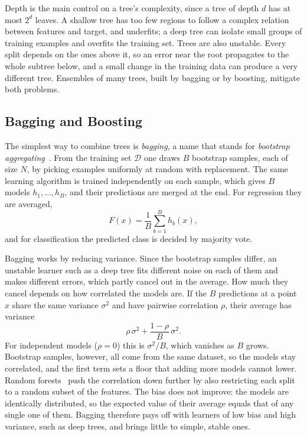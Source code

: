     Depth is the main control on a tree's complexity, since a tree of depth $d$ has
    at most $2^d$ leaves. A shallow tree has too few regions to follow a complex
    relation between features and target, and underfits; a deep tree can
    isolate small groups of training examples and overfits the training set.
    Trees are also unstable. Every split depends on the ones above it, so an
    error near the root propagates to the whole subtree below, and a small
    change in the training data can produce a very different tree. Ensembles of
    many trees, built by bagging or by boosting, mitigate both problems.

    \subsection{Bagging and Boosting}
    \label{subsec:bg:gbm:boosting}
    The simplest way to combine trees is \emph{bagging}, a name that stands for
    \emph{bootstrap aggregating}~\cite{breiman1996}. From the training set
    $\mathcal{D}$ one draws $B$ bootstrap samples, each of size $N$, by picking
    examples uniformly at random with replacement. The same learning algorithm is
    trained independently on each sample, which gives $B$ models
    $h_1, \dots, h_B$, and their predictions are merged at the end. For regression
    they are averaged,
    \begin{equation}
    F(x) = \frac{1}{B} \sum_{b=1}^{B} h_b(x),
    \label{eq:bg:gbm:bagging}
    \end{equation}
    and for classification the predicted class is decided by majority
    vote.
    
    Bagging works by reducing variance. Since the bootstrap samples differ, an
    unstable learner such as a deep tree fits different noise on each of them and
    makes different errors, which partly cancel out in the average. How much they
    cancel depends on how correlated the models are. If the $B$ predictions at a
    point $x$ share the same variance $\sigma^2$ and have pairwise correlation
    $\rho$, their average has variance~\cite{hastie2009}
    \begin{equation}
    \rho\, \sigma^{2} + \frac{1 - \rho}{B}\, \sigma^{2}.
    \label{eq:bg:gbm:bagvar}
    \end{equation}
    For independent models ($\rho = 0$) this is $\sigma^2 / B$, which vanishes as
    $B$ grows. Bootstrap samples, however, all come from the same dataset, so the
    models stay correlated, and the first term sets a floor that adding more
    models cannot lower. Random forests~\cite{breiman2001} push the correlation
    down further by also restricting each split to a random subset of the
    features. The bias does not improve: the models are identically distributed,
    so the expected value of their average equals that of any single one of
    them. Bagging therefore pays off with learners of low bias
    and high variance, such as deep trees, and brings little to simple, stable
    ones.
    
